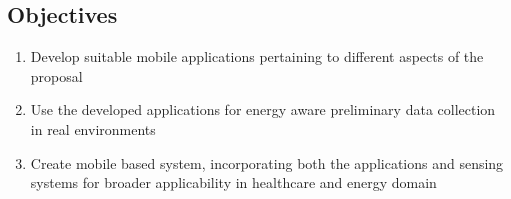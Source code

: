 \documentclass[a0,portrait]{a0poster}
\begin{document}
\begin{multicols}{2}



%
\color{SaddleBrown}
\section*{Objectives}
%
\color{DarkSlateGray}
\begin{enumerate}
\item Develop suitable mobile applications pertaining to different aspects of the proposal
\item Use the developed applications for energy aware preliminary data collection in real environments
\item Create mobile based system, incorporating both the applications and sensing systems for broader applicability in healthcare and energy domain

\end{enumerate}


\color{SaddleBrown} %


\end{multicols}
\end{document}

